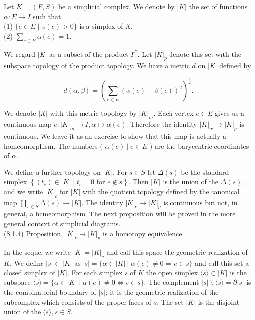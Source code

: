\documentclass[10pt, letterpaper]{article}
\begin{document}
Let $K=(E, S)$ be a simplicial complex. We denote by $|K|$ the set of functions $\alpha: E \rightarrow I$ such that\\
(1) $\{e \in E \mid \alpha(e)>0\}$ is a simplex of $K$.\\
(2) $\sum_{e \in E} \alpha(e)=1$.

We regard $|K|$ as a subset of the product $I^{E}$. Let $|K|_{p}$ denote this set with the subspace topology of the product topology. We have a metric $d$ on $|K|$ defined by

$$
d(\alpha, \beta)=\left(\sum_{e \in E}(\alpha(e)-\beta(e))^{2}\right)^{\frac{1}{2}} .
$$

We denote $|K|$ with this metric topology by $|K|_{m}$. Each vertex $e \in E$ gives us a continuous map $e:|K|_{m} \rightarrow I, \alpha \mapsto \alpha(e)$. Therefore the identity $|K|_{m} \rightarrow|K|_{p}$ is\\
continuous. We leave it as an exercise to show that this map is actually a homeomorphism. The numbers ( $\alpha(e) \mid e \in E$ ) are the barycentric coordinates of $\alpha$.

We define a further topology on $|K|$. For $s \in S$ let $\Delta(s)$ be the standard simplex $\left\{\left(t_{e}\right) \in|K| \mid t_{e}=0\right.$ for $\left.e \notin s\right\}$. Then $|K|$ is the union of the $\Delta(s)$, and we write $|K|_{c}$ for $|K|$ with the quotient topology defined by the canonical map $\coprod_{s \in S} \Delta(s) \rightarrow|K|$. The identity $|K|_{c} \rightarrow|K|_{p}$ is continuous but not, in general, a homeomorphism. The next proposition will be proved in the more general context of simplicial diagrams.\\
(8.1.4) Proposition. $|K|_{c} \rightarrow|K|_{p}$ is a homotopy equivalence.

In the sequel we write $|K|=|K|_{c}$ and call this space the geometric realization of $K$. We define $|s| \subset|K|$ as $|s|=\{\alpha \in|K| \mid \alpha(e) \neq 0 \Rightarrow e \in s\}$ and call this set a closed simplex of $|K|$. For each simplex $s$ of $K$ the open simplex $\langle s\rangle \subset|K|$ is the subspace $\langle s\rangle=\{\alpha \in|K| \mid \alpha(e) \neq 0 \Leftrightarrow e \in s\}$. The complement $|s| \backslash\langle s\rangle=\partial|s|$ is the combinatorial boundary of $|s|$; it is the geometric realization of the subcomplex which consists of the proper faces of $s$. The set $|K|$ is the disjoint union of the $\langle s\rangle, s \in S$.
\end{document}
